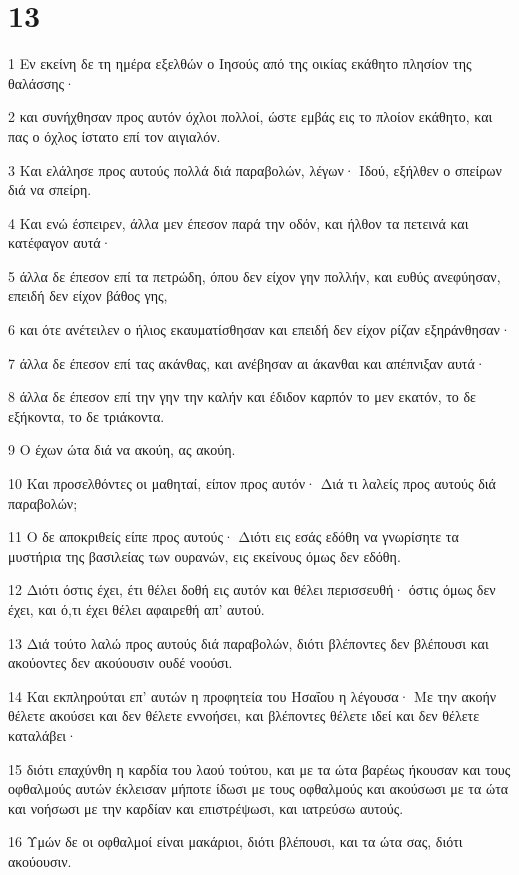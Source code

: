 \chapter{13}

\par 1 Εν εκείνη δε τη ημέρα εξελθών ο Ιησούς από της οικίας εκάθητο πλησίον της θαλάσσης·
\par 2 και συνήχθησαν προς αυτόν όχλοι πολλοί, ώστε εμβάς εις το πλοίον εκάθητο, και πας ο όχλος ίστατο επί τον αιγιαλόν.
\par 3 Και ελάλησε προς αυτούς πολλά διά παραβολών, λέγων· Ιδού, εξήλθεν ο σπείρων διά να σπείρη.
\par 4 Και ενώ έσπειρεν, άλλα μεν έπεσον παρά την οδόν, και ήλθον τα πετεινά και κατέφαγον αυτά·
\par 5 άλλα δε έπεσον επί τα πετρώδη, όπου δεν είχον γην πολλήν, και ευθύς ανεφύησαν, επειδή δεν είχον βάθος γης,
\par 6 και ότε ανέτειλεν ο ήλιος εκαυματίσθησαν και επειδή δεν είχον ρίζαν εξηράνθησαν·
\par 7 άλλα δε έπεσον επί τας ακάνθας, και ανέβησαν αι άκανθαι και απέπνιξαν αυτά·
\par 8 άλλα δε έπεσον επί την γην την καλήν και έδιδον καρπόν το μεν εκατόν, το δε εξήκοντα, το δε τριάκοντα.
\par 9 Ο έχων ώτα διά να ακούη, ας ακούη.
\par 10 Και προσελθόντες οι μαθηταί, είπον προς αυτόν· Διά τι λαλείς προς αυτούς διά παραβολών;
\par 11 Ο δε αποκριθείς είπε προς αυτούς· Διότι εις εσάς εδόθη να γνωρίσητε τα μυστήρια της βασιλείας των ουρανών, εις εκείνους όμως δεν εδόθη.
\par 12 Διότι όστις έχει, έτι θέλει δοθή εις αυτόν και θέλει περισσευθή· όστις όμως δεν έχει, και ό,τι έχει θέλει αφαιρεθή απ' αυτού.
\par 13 Διά τούτο λαλώ προς αυτούς διά παραβολών, διότι βλέποντες δεν βλέπουσι και ακούοντες δεν ακούουσιν ουδέ νοούσι.
\par 14 Και εκπληρούται επ' αυτών η προφητεία του Ησαΐου η λέγουσα· Με την ακοήν θέλετε ακούσει και δεν θέλετε εννοήσει, και βλέποντες θέλετε ιδεί και δεν θέλετε καταλάβει·
\par 15 διότι επαχύνθη η καρδία του λαού τούτου, και με τα ώτα βαρέως ήκουσαν και τους οφθαλμούς αυτών έκλεισαν μήποτε ίδωσι με τους οφθαλμούς και ακούσωσι με τα ώτα και νοήσωσι με την καρδίαν και επιστρέψωσι, και ιατρεύσω αυτούς.
\par 16 Υμών δε οι οφθαλμοί είναι μακάριοι, διότι βλέπουσι, και τα ώτα σας, διότι ακούουσιν.
